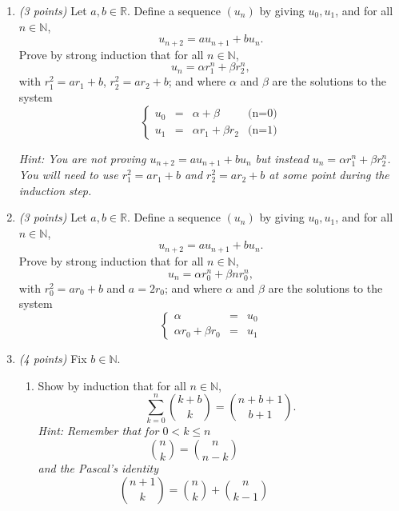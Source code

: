 \documentclass[12pt]{article}
\begin{document}
\begin{enumerate}

\item \emph{(3 points)} Let \( a, b \in \mathbb{R} \). Define a sequence \( (u_n) \) by giving \( u_0, u_1 \), and for all \( n \in \mathbb{N} \),
\[
u_{n+2} = a u_{n+1} + b u_n.
\]
Prove by strong induction that for all \( n \in \mathbb{N} \),
\[
u_n = \alpha r_1^n + \beta r_2^n,
\]
with \( r_1^2 = a r_1 + b \), \( r_2^2 = a r_2 + b \); and where \( \alpha \) and \( \beta \) are the solutions to the system
\[
\left\{
\begin{array}{rcll}
u_0 & = & \alpha + \beta & \text{(n=0)} \\
u_1 &= & \alpha r_1 + \beta r_2 & \text{(n=1)}
\end{array}
\right.
\]

\emph{Hint: You are not proving \( u_{n+2} = a u_{n+1} + b u_n \) but instead \( u_n = \alpha r_1^n + \beta r_2^n \). You will need to use \( r_1^2 = a r_1 + b \) and \( r_2^2 = a r_2 + b \) at some point during the induction step.} \newline


\item \emph{(3 points)} Let \( a, b \in \mathbb{R} \). Define a sequence \( (u_n) \) by giving \( u_0, u_1 \), and for all \( n \in \mathbb{N} \),
\[
u_{n+2} = a u_{n+1} + b u_n.
\]
Prove by strong induction that for all \( n \in \mathbb{N} \),
\[
u_n = \alpha r_0^n + \beta n r_0^n,
\]
with \( r_0^2 = a r_0 + b \) and \( a = 2r_0 \); and where \( \alpha \) and \( \beta \) are the solutions to the system
\[
\left\{
\begin{array}{rcl}
  \alpha & = & u_0 \\
  \alpha r_0 + \beta r_0 & = & u_1
\end{array}
\right.
\] \newline



\item \emph{(4 points)} Fix \( b \in \mathbb{N} \).

\begin{enumerate}
\item Show by induction that for all \( n \in \mathbb{N} \),
\[
\sum_{k = 0}^n \binom{k+b}{k} = \binom{n + b + 1}{b+1}.
\]
\emph{Hint: Remember that for \( 0 < k \leq n \)} 
\[
\binom{n}{k} = \binom{n}{n-k} \hspace{1cm} \hspace{1cm} 
\]
\emph{and the Pascal's identity}
\[
\binom{n+1}{k} = \binom{n}{k} + \binom{n}{k-1}  \hspace{1cm} \hspace{1cm} 
\] \newline


\end{enumerate}
\end{enumerate}
\end{document}
